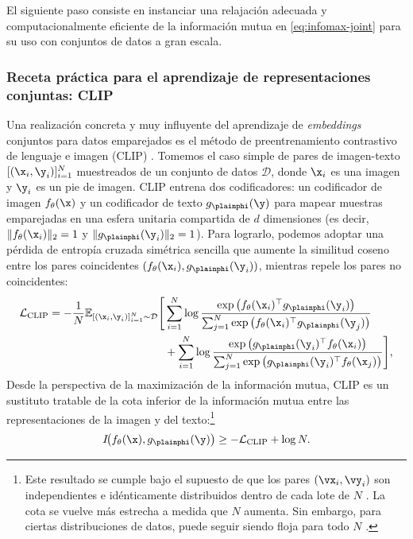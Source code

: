 \documentclass[../../book-main_es.tex]{subfiles}
\begin{document}
El siguiente paso consiste en instanciar una relajación adecuada y computacionalmente eficiente
de la información mutua en \eqref{eq:infomax-joint} para su uso con conjuntos de datos
a gran escala.

\subsubsection{Receta práctica para el aprendizaje de representaciones conjuntas: CLIP}

Una realización concreta y muy influyente del aprendizaje de
\textit{embeddings} conjuntos para datos emparejados es el método de
preentrenamiento contrastivo de lenguaje e imagen (CLIP) \cite{radford2021learning}.
Tomemos el caso simple de pares de imagen-texto $[(\x_i, \y_i)]_{i=1}^N$
muestreados de un conjunto de datos $\mathcal{D}$, donde $\x_i$ es una imagen y
$\y_i$ es un pie de imagen.
CLIP entrena dos codificadores: un codificador de imagen $f_{\theta}(\x)$ y un codificador de texto
$g_{\plainphi}(\y)$ para mapear muestras emparejadas en una esfera unitaria compartida
de $d$ dimensiones (es decir, $\|f_{\theta}(\x_i)\|_2 = 1$ y
$\|g_{\plainphi}(\y_i)\|_2 = 1$).
Para lograrlo, podemos adoptar una pérdida de entropía cruzada simétrica sencilla
que aumente la similitud coseno entre los pares coincidentes 
$(f_{\theta}(\x_i),g_{\plainphi}(\y_i))$, mientras
repele los pares no coincidentes:
\begin{align}
    \mathcal{L}_{\mathrm{CLIP}} = -\frac{1}{N}\mathbb{E}_{[(\x_i,
        \y_i)]_{i=1}^N \sim
    \mathcal{D}} \Biggr[  &\sum_{i=1}^N\log \frac{\exp\left(
                f_{\theta}(\x_i)^\top g_{\plainphi}(\y_i)
        \right)}{\sum_{j=1}^N \exp\left( f_{\theta}(\x_i)^\top
        g_{\plainphi}(\y_j) \right)} \nonumber \\
        &+\sum_{i=1}^N\log \frac{\exp\left( g_{\plainphi}(\y_i)^\top
        f_{\theta}(\x_i) \right)}{\sum_{j=1}^N \exp\left(
    g_{\plainphi}(\y_i)^\top f_{\theta}(\x_j) \right)} \Biggr],
    \label{eq:clip-loss}
\end{align}
Desde la perspectiva de la maximización de la información mutua, CLIP es un sustituto tratable
de la cota inferior de la información mutua entre las representaciones de la imagen y
del texto:\footnote{Este resultado se cumple bajo el supuesto de que los
    pares $(\vx_i, \vy_i)$ son independientes e idénticamente distribuidos dentro de cada lote de $N$
    \cite[Lema 1]{Oko2025-wk}. La cota se vuelve más estrecha a medida que $N$ aumenta\cite{Van_den_Oord2018-qf}.
    Sin embargo, para ciertas distribuciones de datos, puede seguir siendo floja para todo $N$
\cite{mcallester2019formal,10.5555/3524938.3525859}.}
\begin{equation}
    I\!\big(f_{\theta}(\x),g_{\plainphi}(\y)\big) \geq -
    \mathcal{L}_{\mathrm{CLIP}} + \log N.
\end{equation}
\end{document}
